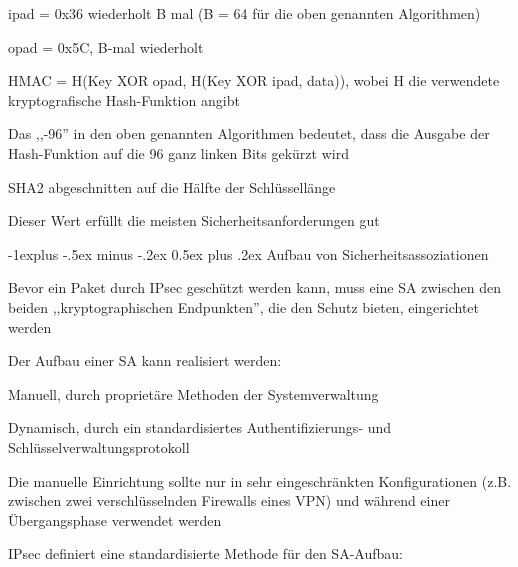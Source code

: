 \documentclass[a4paper]{article}
\makeatletter
\renewcommand{\subsection}{\@startsection{subsection}{2}{0mm}%
 {-1explus -.5ex minus -.2ex}%
 {0.5ex plus .2ex}%
 {\normalfont\normalsize\bfseries}}
\makeatother
\begin{document}
\begin{multicols}{3}
\begin{itemize*}
\begin{itemize*}
                  \begin{itemize*} \item ipad = 0x36 wiederholt B mal (B = 64 für die oben genannten Algorithmen) \item opad = 0x5C, B-mal wiederholt \item HMAC = H(Key XOR opad, H(Key XOR ipad, data)), wobei H die verwendete kryptografische Hash-Funktion angibt \end{itemize*}
                  \item Das ,,-96'' in den oben genannten Algorithmen bedeutet, dass die Ausgabe der Hash-Funktion auf die 96 ganz linken Bits gekürzt wird
                  \item SHA2 abgeschnitten auf die Hälfte der Schlüssellänge
                  \item Dieser Wert erfüllt die meisten Sicherheitsanforderungen gut
            \end{itemize*}
      \end{itemize*}


      \subsection{Aufbau von
            Sicherheitsassoziationen}

      \begin{itemize*}
            \item
            Bevor ein Paket durch IPsec geschützt werden kann, muss eine SA
            zwischen den beiden ,,kryptographischen Endpunkten'', die den Schutz
            bieten, eingerichtet werden
            \item
            Der Aufbau einer SA kann realisiert werden:

            \begin{itemize*}
                  \item Manuell, durch proprietäre Methoden der Systemverwaltung
                  \item Dynamisch, durch ein standardisiertes Authentifizierungs- und Schlüsselverwaltungsprotokoll
                  \item Die manuelle Einrichtung sollte nur in sehr eingeschränkten Konfigurationen (z.B. zwischen zwei verschlüsselnden Firewalls eines VPN) und während einer Übergangsphase verwendet werden
            \end{itemize*}
            \item
            IPsec definiert eine standardisierte Methode für den SA-Aufbau:


\end{itemize*}
\end{multicols}
\end{document}
